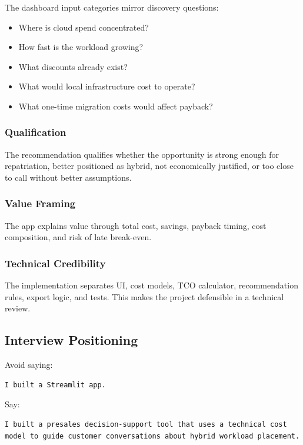 \documentclass[11pt,a4paper]{article}
\begin{document}
The dashboard input categories mirror discovery questions:

\begin{itemize}
  \item Where is cloud spend concentrated?
  \item How fast is the workload growing?
  \item What discounts already exist?
  \item What would local infrastructure cost to operate?
  \item What one-time migration costs would affect payback?
\end{itemize}

\subsubsection{Qualification}

The recommendation qualifies whether the opportunity is strong enough for repatriation, better positioned as hybrid, not economically justified, or too close to call without better assumptions.

\subsubsection{Value Framing}

The app explains value through total cost, savings, payback timing, cost composition, and risk of late break-even.

\subsubsection{Technical Credibility}

The implementation separates UI, cost models, TCO calculator, recommendation rules, export logic, and tests. This makes the project defensible in a technical review.

\subsection{Interview Positioning}

Avoid saying:

\begin{lstlisting}
I built a Streamlit app.
\end{lstlisting}

Say:

\begin{lstlisting}
I built a presales decision-support tool that uses a technical cost model to guide customer conversations about hybrid workload placement.
\end{lstlisting}
\end{document}
